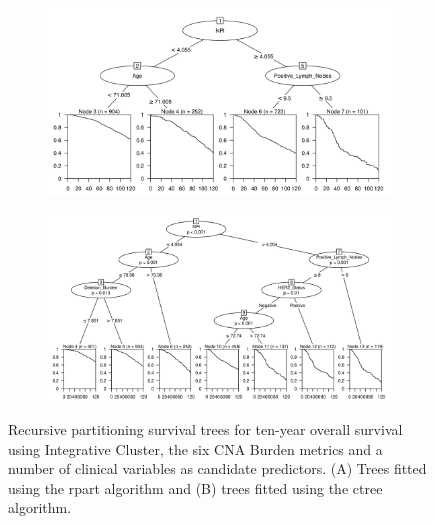 \begin{figure}[!htb]
\centering

\vspace{1cm}

\begin{subfigure}{\textwidth}
\subcaption{}
\includegraphics[width=1\textwidth]{../figures/Appendices/Appendix_B/Clin_PartyKit_Survival_Burden_TenYearOS_INTCLUST.png}
\end{subfigure}

\vspace{2cm}

\begin{subfigure}{\textwidth}
\subcaption{}
\includegraphics[width=1\textwidth]{../figures/Appendices/Appendix_B/Clin_Ctree_Survival_Burden_TenYearOS_INTCLUST.png}
\end{subfigure}

\vspace{1cm}

\caption[Recursive partitioning survival trees for ten-year overall survival using Integrative Cluster, the six CNA Burden metrics and a number of clinical variables as candidate predictors.]{Recursive partitioning survival trees for ten-year overall survival using Integrative Cluster, the six CNA Burden metrics and a number of clinical variables as candidate predictors. (A) Trees fitted using the rpart algorithm and (B) trees fitted using the ctree algorithm.}
\end{figure}

